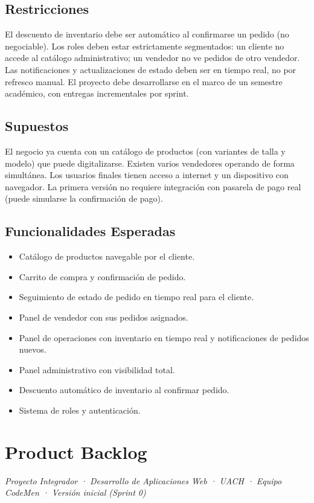 \documentclass[12pt, a4paper]{article}
\begin{document}
\subsection{Restricciones}
El descuento de inventario debe ser automático al confirmarse un pedido (no negociable). Los roles deben estar estrictamente segmentados: un cliente no accede al catálogo administrativo; un vendedor no ve pedidos de otro vendedor. Las notificaciones y actualizaciones de estado deben ser en tiempo real, no por refresco manual. El proyecto debe desarrollarse en el marco de un semestre académico, con entregas incrementales por sprint.

\subsection{Supuestos}
El negocio ya cuenta con un catálogo de productos (con variantes de talla y modelo) que puede digitalizarse. Existen varios vendedores operando de forma simultánea. Los usuarios finales tienen acceso a internet y un dispositivo con navegador. La primera versión no requiere integración con pasarela de pago real (puede simularse la confirmación de pago).

\subsection{Funcionalidades Esperadas}
\begin{itemize}[leftmargin=*]
    \item Catálogo de productos navegable por el cliente.
    \item Carrito de compra y confirmación de pedido.
    \item Seguimiento de estado de pedido en tiempo real para el cliente.
    \item Panel de vendedor con sus pedidos asignados.
    \item Panel de operaciones con inventario en tiempo real y notificaciones de pedidos nuevos.
    \item Panel administrativo con visibilidad total.
    \item Descuento automático de inventario al confirmar pedido.
    \item Sistema de roles y autenticación.
\end{itemize}


\section{Product Backlog}
\textit{Proyecto Integrador · Desarrollo de Aplicaciones Web · UACH · Equipo CodeMen · Versión inicial (Sprint 0)}
\end{document}
